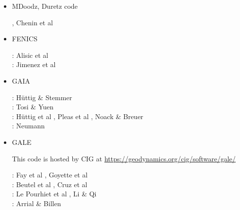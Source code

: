 \begin{itemize}
\item {\codefont MDoodz}, Duretz code

{\small
\cite{yatd12}
\cite{yahb13}
\cite{yadm15}
\cite{dumy16}\cite{dupm16}
\cite{chmd19}\cite{dual19}\cite{pedm19}
\cite{poyd20}\cite{bedh20}, Chenin et al \cite{chsm20}
}

\item {\codefont FENICS} 

\begin{scriptsize}
\noindent
\twothousandfourteen: Alisic et al \cite{alrk14}\\
\twothousandseventeen: Jimenez et al \cite{jidb17}
\end{scriptsize}


\item {\codefont GAIA} 

\begin{scriptsize}
\noindent
\twothousandeight: H{\"u}ttig \& Stemmer \cite{hust08b} \\
\twothousandeleven: Tosi \& Yuen \cite{toyu11} \\
\twothousandthirteen: H{\"u}ttig et al \cite{hutm13}, Pleas et al \cite{plth13}, Noack \& Breuer \cite{nobr13} \\
\twothousandnineteen: Neumann \cite{neum19}
\end{scriptsize}

\item {\codefont GALE} 

This code is hosted by CIG at \url{https://geodynamics.org/cig/software/gale/}

\begin{scriptsize}
\noindent
\twothousandeight:
Fay et al \cite{fabs08}, Goyette et al \cite{gotc08}\\
\twothousandten:
Beutel et al \cite{beve10}, Cruz et al \cite{crmw10}\\
\twothousandtwelve:
Le Pourhiet et al \cite{lehm12}, Li \& Qi \cite{liqi12}\\
\twothousandthirteen:
Arrial \& Billen \cite{arbi13}
\end{scriptsize}


\end{itemize}

